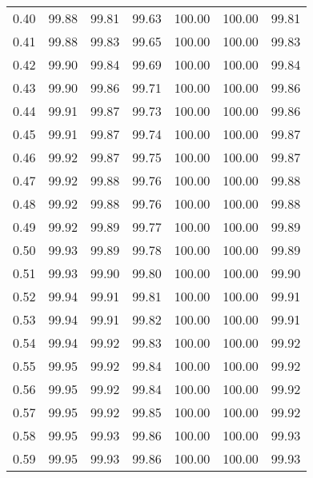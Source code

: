 \begin{tabular}{|c|c|c|c|c|c|c|}
      0.40 &     99.88 &     99.81 &      99.63 &  100.00 &     100.00 &         99.81 \\
      0.41 &     99.88 &     99.83 &      99.65 &  100.00 &     100.00 &         99.83 \\
      0.42 &     99.90 &     99.84 &      99.69 &  100.00 &     100.00 &         99.84 \\
      0.43 &     99.90 &     99.86 &      99.71 &  100.00 &     100.00 &         99.86 \\
      0.44 &     99.91 &     99.87 &      99.73 &  100.00 &     100.00 &         99.86 \\
      0.45 &     99.91 &     99.87 &      99.74 &  100.00 &     100.00 &         99.87 \\
      0.46 &     99.92 &     99.87 &      99.75 &  100.00 &     100.00 &         99.87 \\
      0.47 &     99.92 &     99.88 &      99.76 &  100.00 &     100.00 &         99.88 \\
      0.48 &     99.92 &     99.88 &      99.76 &  100.00 &     100.00 &         99.88 \\
      0.49 &     99.92 &     99.89 &      99.77 &  100.00 &     100.00 &         99.89 \\
      0.50 &     99.93 &     99.89 &      99.78 &  100.00 &     100.00 &         99.89 \\
      0.51 &     99.93 &     99.90 &      99.80 &  100.00 &     100.00 &         99.90 \\
      0.52 &     99.94 &     99.91 &      99.81 &  100.00 &     100.00 &         99.91 \\
      0.53 &     99.94 &     99.91 &      99.82 &  100.00 &     100.00 &         99.91 \\
      0.54 &     99.94 &     99.92 &      99.83 &  100.00 &     100.00 &         99.92 \\
      0.55 &     99.95 &     99.92 &      99.84 &  100.00 &     100.00 &         99.92 \\
      0.56 &     99.95 &     99.92 &      99.84 &  100.00 &     100.00 &         99.92 \\
      0.57 &     99.95 &     99.92 &      99.85 &  100.00 &     100.00 &         99.92 \\
      0.58 &     99.95 &     99.93 &      99.86 &  100.00 &     100.00 &         99.93 \\
      0.59 &     99.95 &     99.93 &      99.86 &  100.00 &     100.00 &         99.93 \\

\end{tabular}
